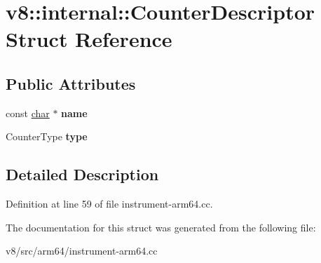 \hypertarget{structv8_1_1internal_1_1CounterDescriptor}{}\section{v8\+:\+:internal\+:\+:Counter\+Descriptor Struct Reference}
\label{structv8_1_1internal_1_1CounterDescriptor}
\subsection*{Public Attributes}
\begin{DoxyCompactItemize}
\item 
\mbox{\label{structv8_1_1internal_1_1CounterDescriptor_a3959d8bcb4fd672e299a0f8d7e81fc26}} 
const \mbox{\hyperlink{classchar}{char}} $\ast$ {\bfseries name}
\item 
\mbox{\label{structv8_1_1internal_1_1CounterDescriptor_a7e83018c112302c8e199e582cb43d901}} 
Counter\+Type {\bfseries type}
\end{DoxyCompactItemize}


\subsection{Detailed Description}


Definition at line 59 of file instrument-\/arm64.\+cc.



The documentation for this struct was generated from the following file\+:\begin{DoxyCompactItemize}
\item 
v8/src/arm64/instrument-\/arm64.\+cc\end{DoxyCompactItemize}
